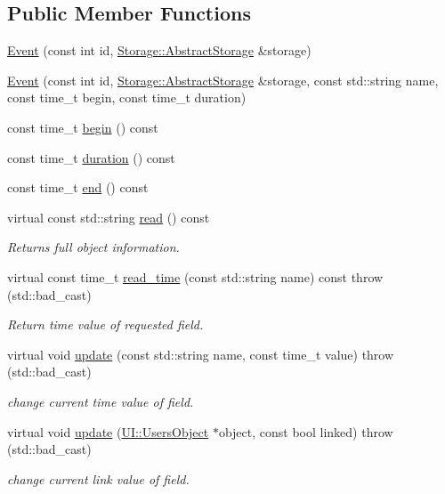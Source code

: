 \subsection*{Public Member Functions}
\begin{DoxyCompactItemize}
\item 
\hyperlink{classCore_1_1Event_a067e37070ea0fa9b39d7d1171c2f9a2d}{Event} (const int id, \hyperlink{classStorage_1_1AbstractStorage}{Storage::AbstractStorage} \&storage)
\item 
\hyperlink{classCore_1_1Event_aa4a154dde2ab0f1e011fc2f41909cb43}{Event} (const int id, \hyperlink{classStorage_1_1AbstractStorage}{Storage::AbstractStorage} \&storage, const std::string name, const time\_\-t begin, const time\_\-t duration)
\item 
const time\_\-t \hyperlink{classCore_1_1Event_a829b19b781b4d5989928c021b3a3553a}{begin} () const 
\item 
const time\_\-t \hyperlink{classCore_1_1Event_ad83a2109fa632352f63adfdafe2dc86f}{duration} () const 
\item 
const time\_\-t \hyperlink{classCore_1_1Event_af83b91c07834359638a4f7473abad5c5}{end} () const 
\item 
virtual const std::string \hyperlink{classCore_1_1Event_a8dd94bcb05cb3c5ef065fa204cd724f9}{read} () const 
\begin{DoxyCompactList}\small\item\em Returns full object information. \item\end{DoxyCompactList}\item 
virtual const time\_\-t \hyperlink{classCore_1_1Event_a4977832cb03001d8afe46bcddc60ce1a}{read\_\-time} (const std::string name) const   throw (std::bad\_\-cast)
\begin{DoxyCompactList}\small\item\em Return time value of requested field. \item\end{DoxyCompactList}\item 
virtual void \hyperlink{classCore_1_1Event_aaa4b9def6b65cc896e0054210b2d5dae}{update} (const std::string name, const time\_\-t value)  throw (std::bad\_\-cast)
\begin{DoxyCompactList}\small\item\em change current time value of field. \item\end{DoxyCompactList}\item 
virtual void \hyperlink{classCore_1_1Event_a308ae7ad334b8c9a166dc57cfd6a0524}{update} (\hyperlink{classUI_1_1UsersObject}{UI::UsersObject} $\ast$object, const bool linked)  throw (std::bad\_\-cast)
\begin{DoxyCompactList}\small\item\em change current link value of field. \item\end{DoxyCompactList}\end{DoxyCompactItemize}
